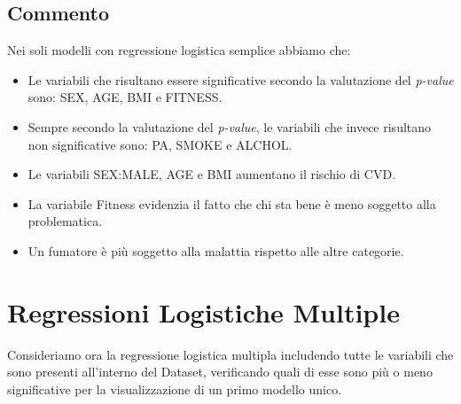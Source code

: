 \documentclass{article}\usepackage[]{graphicx}\usepackage[]{xcolor}
\begin{document}
  \subsection{Commento}
    Nei soli modelli con regressione logistica semplice abbiamo che:
    \begin{itemize}
      \item Le variabili che risultano essere significative secondo la valutazione
            del \emph{p-value} sono: SEX, AGE, BMI e FITNESS.
      \item Sempre secondo la valutazione del \emph{p-value}, le variabili che 
            invece risultano non significative sono: PA, SMOKE e ALCHOL.
      \item Le variabili SEX:MALE, AGE e BMI aumentano il rischio di CVD.
      \item La variabile Fitness evidenzia il fatto che chi sta bene è meno
            soggetto alla problematica.
      \item Un fumatore è più soggetto alla malattia rispetto alle altre categorie.
    \end{itemize}
  
\clearpage


\section{Regressioni Logistiche Multiple}
  Consideriamo ora la regressione logistica multipla includendo tutte le variabili
  che sono presenti all'interno del Dataset, verificando quali di esse sono più 
  o meno significative per la visualizzazione di un primo modello unico.
  
\end{document}
